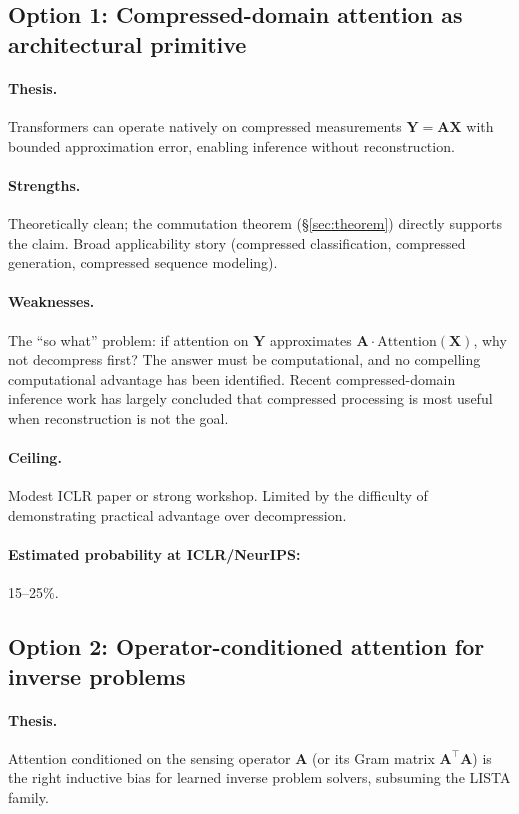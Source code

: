 \documentclass[11pt]{article}
\newcommand{\A}{\mathbf{A}}
\newcommand{\X}{\mathbf{X}}
\newcommand{\Y}{\mathbf{Y}}
\begin{document}
\subsection{Option 1: Compressed-domain attention as architectural
primitive}

\paragraph{Thesis.}
Transformers can operate natively on compressed measurements
$\Y = \A\X$ with bounded approximation error, enabling
inference without reconstruction.

\paragraph{Strengths.}
Theoretically clean; the commutation theorem
(\S\ref{sec:theorem}) directly supports the claim.
Broad applicability story (compressed classification,
compressed generation, compressed sequence modeling).

\paragraph{Weaknesses.}
The ``so what'' problem: if attention on $\Y$ approximates
$\A \cdot \mathrm{Attention}(\X)$, why not decompress first?
The answer must be computational, and no compelling
computational advantage has been identified.
Recent compressed-domain inference work has largely concluded
that compressed processing is most useful when reconstruction
is not the goal.

\paragraph{Ceiling.}
Modest ICLR paper or strong workshop. Limited by the
difficulty of demonstrating practical advantage over
decompression.

\paragraph{Estimated probability at ICLR/NeurIPS:} 15--25\%.

\subsection{Option 2: Operator-conditioned attention for inverse
problems}

\paragraph{Thesis.}
Attention conditioned on the sensing operator $\A$ (or its
Gram matrix $\A^\top\A$) is the right inductive bias for
learned inverse problem solvers, subsuming the LISTA family.
\end{document}
